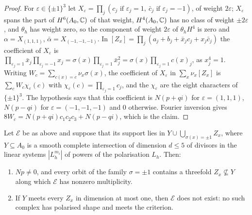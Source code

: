 \begin{proof}
For $\varepsilon\in\{\pm1\}^{3}$ let $X_{\varepsilon}=\prod_{j}(c_{j}\text{ if }\varepsilon_{j}=1,\ \bar c_{j}\text{ if }\varepsilon_{j}=-1)$, of weight $2\varepsilon$; $X_{\varepsilon}$ spans the part of $H^{6}(A_{0},\mathbb{C})$ of that weight, $H^{4}(A_{0},\mathbb{C})$ has no class of weight $\pm2\varepsilon$, and $\theta_{h}$ has weight zero, so the component of weight $2\varepsilon$ of $\theta_{h}H^{4}$ is zero and $\alpha=X_{(1,1,1)}$, $\bar\alpha=X_{(-1,-1,-1)}$. In $[Z_{x}]=\prod_{j}(a_{j}+b_{j}+\bar x_{j}c_{j}+x_{j}\bar c_{j})$ the coefficient of $X_{\varepsilon}$ is $\prod_{\varepsilon_{j}=1}\bar x_{j}\prod_{\varepsilon_{j}=-1}x_{j}=\sigma(x)\prod_{\varepsilon_{j}=1}\bar x_{j}^{2}=\sigma(x)\prod_{\varepsilon_{j}=1}c(x)_{j}$, as $x_{j}^{4}=1$. Writing $W_{c}=\sum_{c(x)=c}\nu_{x}\sigma(x)$, the coefficient of $X_{\varepsilon}$ in $\sum_{x}\nu_{x}[Z_{x}]$ is $\sum_{c}W_{c}\chi_{\varepsilon}(c)$ with $\chi_{\varepsilon}(c)=\prod_{\varepsilon_{j}=1}c_{j}$, and the $\chi_{\varepsilon}$ are the eight characters of $\{\pm1\}^{3}$. The hypothesis says that this coefficient is $N(p+qi)$ for $\varepsilon=(1,1,1)$, $N(p-qi)$ for $\varepsilon=(-1,-1,-1)$ and $0$ otherwise. Fourier inversion gives $8W_{c}=N(p+qi)c_{1}c_{2}c_{3}+N(p-qi)$, which is the claim.
\end{proof}

\begin{proposition}\label{prop:ci}
Let $\mathcal{E}$ be as above and suppose that its support lies in $Y\cup\bigcup_{\sigma(x)=\pm1}Z_{x}$, where $Y\subseteq A_{0}$ is a smooth complete intersection of dimension $d\le5$ of divisors in the linear systems $|L_{h}^{m_{i}}|$ of powers of the polarisation $L_{h}$. Then:
\begin{enumerate}
\item[(i)] $Np\ne0$, and every orbit of the family $\sigma=\pm1$ contains a threefold $Z_{x}\not\subseteq Y$ along which $\mathcal{E}$ has nonzero multiplicity.
\item[(ii)] If $Y$ meets every $Z_{x}$ in dimension at most one, then $\mathcal{E}$ does not exist: no such complex has polarised shape and meets the criterion.
\end{enumerate}
\end{proposition}

